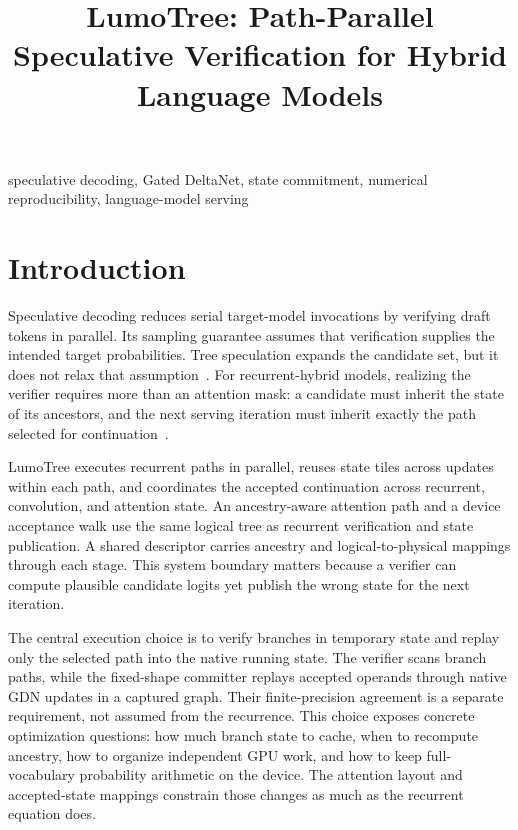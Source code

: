 \documentclass[conference]{IEEEtran}
\newcommand{\sys}{LumoTree}
\begin{document}
\raggedbottom
\title{LumoTree: Path-Parallel Speculative Verification for Hybrid Language Models}
\author{
}
\maketitle

\begin{IEEEkeywords}
speculative decoding, Gated DeltaNet, state commitment, numerical reproducibility, language-model serving
\end{IEEEkeywords}

\section{Introduction}
Speculative decoding reduces serial target-model invocations by verifying draft tokens in parallel. Its sampling guarantee assumes that verification supplies the intended target probabilities. Tree speculation expands the candidate set, but it does not relax that assumption~\cite{leviathan2023fast,chen2023sampling,miao2023specinfer}. For recurrent-hybrid models, realizing the verifier requires more than an attention mask: a candidate must inherit the state of its ancestors, and the next serving iteration must inherit exactly the path selected for continuation~\cite{yang2024gated,wu2025stree}.

\sys{} executes recurrent paths in parallel, reuses state tiles across updates within each path, and coordinates the accepted continuation across recurrent, convolution, and attention state. An ancestry-aware attention path and a device acceptance walk use the same logical tree as recurrent verification and state publication. A shared descriptor carries ancestry and logical-to-physical mappings through each stage. This system boundary matters because a verifier can compute plausible candidate logits yet publish the wrong state for the next iteration.

The central execution choice is to verify branches in temporary state and replay only the selected path into the native running state. The verifier scans branch paths, while the fixed-shape committer replays accepted operands through native GDN updates in a captured graph. Their finite-precision agreement is a separate requirement, not assumed from the recurrence. This choice exposes concrete optimization questions: how much branch state to cache, when to recompute ancestry, how to organize independent GPU work, and how to keep full-vocabulary probability arithmetic on the device. The attention layout and accepted-state mappings constrain those changes as much as the recurrent equation does.
\end{document}
